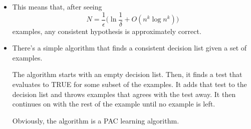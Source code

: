 \documentclass[10pt]{article}
\begin{document}
\begin{itemize}
    \item This means that, after seeing
    $$N = \frac{1}{\epsilon}\bigg( \ln \frac{1}{\delta} + O(n^k \log n^k )\bigg)$$ examples, any consistent hypothesis is approximately
    correct.
    
    \item There's a simple algorithm that finds a 
    consistent decision list given a set of examples. 
    
    The algorithm starts with an empty decision list.
    Then, it finds a test that evaluates to TRUE for some
    subset of the examples. It adds that test to the decision
    list and throws examples that agrees with the test away.
    It then continues on with the rest of the example until
    no example is left.
    
    Obviously, the algorithm is a PAC learning algorithm.
\end{itemize}
\end{document}
